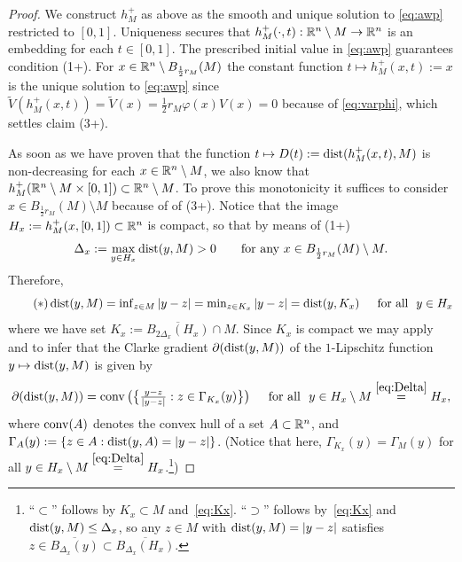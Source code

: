 \begin{proof}
We construct $h_M^+$ as above as the smooth and unique solution to \eqref{eq:awp}
restricted to $[0,1]$.
Uniqueness secures that $h_M^+(\cdot,t):\mathbb{R}^n\setminus M\to\mathbb{R}^n$ is an embedding for
each $t\in [0,1]$. The prescribed initial value in \eqref{eq:awp} guarantees condition
(1+). For $x\in\mathbb{R}^n\setminus B_{\frac12{r_M}}(M)$ the constant function $t\mapsto
h_M^+(x,t):=x$ is the unique solution to \eqref{eq:awp} since 
$\tilde{V}(h_M^+(x,t))=\tilde{V}(x)=\frac12{r_M}\varphi(x)V(x)=0$ because of
\eqref{eq:varphi}, which settles claim (3+). 

As soon as we have proven
that the function $t\mapsto
D(t):=\operatorname{dist}(h_M^+(x,t),M)$ is non-decreasing for each $x\in\mathbb{R}^n\setminus M$, we also know
that $h_M^+(\mathbb{R}^n\setminus M\times [0,1])\subset\mathbb{R}^n\setminus M$.  To prove this
monotonicity it suffices to consider $x\in B_{\frac12{r_M}}(M)\setminus M$ because of
of (3+). Notice that the image $H_x:=h_M^+(x,[0,1])\subset\mathbb{R}^n$ is compact, so that 
by means of (1+)
\begin{equation}\label{eq:Delta}
\Delta_x:=\max_{y\in H_x}\operatorname{dist}(y,M) > 0
\qquad\text{for any }x\in B_{\frac12r_M}(M)\setminus M.
\end{equation}
Therefore,
\begin{equation}\label{eq:Kx}\tag{$*$}
\textstyle\operatorname{dist}(y,M)=\inf_{z\in M}|y-z|=\min_{z\in K_x}|y-z|
=\operatorname{dist}(y,K_x)
\quad\,\,\,\text{for all }\,\, y\in H_x
\end{equation}
where we have set $K_x:=\overline{B_{2\Delta_x}(H_x)}\cap M$. Since $K_x$
is compact we may apply
\cite[Theorem~2.1(4)]{clarke_1975} and 
\cite[Exercise 9.13, p.~99]{clarke-etal_1998}
to infer that the Clarke gradient $\partial (\operatorname{dist}(y,M))$ of the $1$-Lipschitz
function $y\mapsto\operatorname{dist}(y,M)$ is given by
\begin{equation}\label{eq:clarke-gradient}
\textstyle
\partial (\operatorname{dist}(y,M))=\operatorname{conv} \big(\big\{\frac{y-z}{|y-z|}:z\in\Gamma_{K_x}(y)\big\}\big)
\quad\,\,\,\text{for all }\,\, y\in H_x\setminus M \stackrel{\eqref{eq:Delta}}=H_x,
\end{equation}
where $\operatorname{conv}(A)$ denotes the convex hull of a set $A\subset\mathbb{R}^n$, and
$\Gamma_A(y):=\{z\in A:\operatorname{dist}(y,A)=|y-z|\}$. (Notice that here,
$\Gamma_{K_x}(y)=\Gamma_M(y)
$ for all $y\in H_x\setminus M\stackrel{\eqref{eq:Delta}}=H_x$.\footnote{%
``$\subset$'' follows by $K_x\subset M$ and~\eqref{eq:Kx}.
``$\supset$'' follows by~\eqref{eq:Kx} and $\operatorname{dist}(y,M)\le\Delta_x$,
so any $z\in M$ with $\operatorname{dist}(y,M)=|y-z|$ satisfies $z\in \overline{B_{\Delta_x}(y)}
\subset\overline{B_{\Delta_x}(H_x)}$.})

\end{proof}
